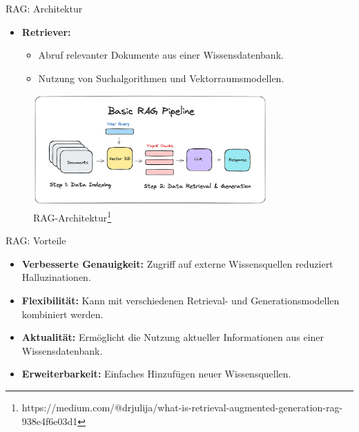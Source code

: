 \documentclass[aspectratio=1610, xcolor=dvipsnames, 9pt]{beamer}
\begin{document}
\begin{frame}{RAG: Architektur}
  \begin{itemize}
    \item \textbf{Retriever:}
      \begin{itemize}
        \item Abruf relevanter Dokumente aus einer Wissensdatenbank. \\
        \item Nutzung von Suchalgorithmen und Vektorraumsmodellen.
      \end{itemize}

  \end{itemize}
  \begin{figure}
    \centering
    \includegraphics[width=0.8\textwidth]{images/basicrag.png}
    \caption{RAG-Architektur\footnote{https://medium.com/@drjulija/what-is-retrieval-augmented-generation-rag-938e4f6e03d1}}
  \end{figure}
\end{frame}

\begin{frame}{RAG: Vorteile}
  \begin{itemize}
    \item \textbf{Verbesserte Genauigkeit:} Zugriff auf externe Wissensquellen reduziert Halluzinationen. \\
    \item \textbf{Flexibilität:} Kann mit verschiedenen Retrieval- und Generationsmodellen kombiniert werden. \\
    \item \textbf{Aktualität:} Ermöglicht die Nutzung aktueller Informationen aus einer Wissensdatenbank. \\
    \item \textbf{Erweiterbarkeit:} Einfaches Hinzufügen neuer Wissensquellen.
  \end{itemize}
\end{frame}
\end{document}
